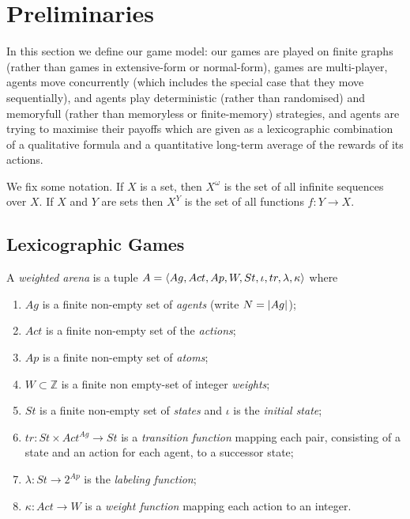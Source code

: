 \section{Preliminaries}



In this section we define our game model: our games are played on finite graphs (rather than games in extensive-form or normal-form), games are multi-player, agents move concurrently (which includes the special case that they move sequentially), and agents play deterministic (rather than randomised) and memoryfull (rather than memoryless or finite-memory) strategies, and agents are trying to maximise their payoffs which are given as a lexicographic combination of a qualitative \LTL formula and a quantitative long-term average of the rewards of its actions.

We fix some notation. If $X$ is a set, then $X^\omega$ is the set of all infinite sequences over $X$. 
If $X$ and $Y$ are sets then $X^Y$ is the set of all functions $f:Y \to X$.

\subsection{Lexicographic Games}
	
		A \emph{weighted arena} is a
		tuple $A=\langle {Ag,  Act, Ap, W, St, \iota,tr, \lambda,\kappa} \rangle$ where
		\begin{enumerate} \item $Ag$ is a finite non-empty set of \emph{agents} (write 
			$N			= |{Ag}|$);
			\item $Act$ is a finite non-empty set of the \emph{actions};
						\item $Ap$ is a finite non-empty set of \emph{atoms};

			\item $W \subset \mathbb{Z}$ is a finite non empty-set of integer \emph{weights}; 
			\item $St$ is a finite non-empty set of \emph{states} and $\iota$
						is the \emph{initial state};
			
			\item $tr: St \times Act^{Ag} \rightarrow St$ is
						a \emph{transition function} mapping each pair, consisting of a
						state and an action for each agent, to a successor state;
			\item $\lambda:St \to 2^{Ap}$ is the \emph{labeling function}; 
			\item $\kappa: Act \to W$ is a \emph{weight function} mapping each action to an integer.
		\end{enumerate}

